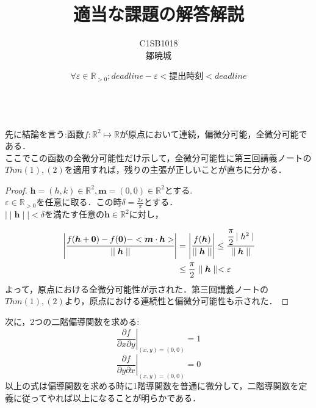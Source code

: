 \documentclass{jarticle}
\begin{document}
\title{適当な課題の解答解説}
\author{C1SB1018 \\鄒暁城}
\date{$\forall \varepsilon \in \mathbb{R}_{>0} ; deadline - \varepsilon < \text{提出時刻} <deadline$}
\maketitle
\noindent
{}\\
先に結論を言う:函数$f : \mathbb{R}^2 \mapsto \mathbb{R}$が原点において連続，偏微分可能，全微分可能である．\\
ここでこの函数の全微分可能性だけ示して，全微分可能性に第三回講義ノートの
$Thm(1),(2)$を適用すれば，残りの主張が正しいことが直ちに分かる．
\begin{proof}
$\bm{h} =(h,k) \in \mathbb{R}^2 , \bm{m} = (0,0) \in \mathbb{R}^2$とする.\\
$ \varepsilon \in \mathbb{R}_{>0} $を任意に取る．この時$ \delta = \frac{2 \varepsilon }{ \pi }$とする．\\
$ \mid \mid \bm{h} \mid \mid < \delta $を満たす任意の$ \bm{h} \in \mathbb{R}^2$に対し，\\
$$
\begin{aligned}
\left| \cfrac{f(\bm{h}+\bm{0})-f(\bm{0}) - < \bm{m} \cdot \bm{h}>}{ \mid \mid \bm{h} \mid \mid } \right| & = \left| \cfrac{f(\bm{h})}{\mid \mid \bm{h} \mid \mid} \right|  \le  \cfrac{\cfrac{\pi}{2} \mid h^2 \mid }{\mid \mid \bm{h} \mid \mid } \\								       
& \le  \frac{\pi}{2}\mid \mid \bm{h} \mid \mid	 <  \varepsilon
\end{aligned}
$$
よって，原点における全微分可能性が示された．第三回講義ノートの$Thm(1),(2)$より，原点における連続性と偏微分可能性も示された．
\end{proof}
次に，2つの二階偏導関数を求める:\\
$$
\left. \frac{\partial f}{\partial x \partial y}\right|_{(x,y)=(0,0)}=1
$$
$$
\left. \frac{\partial f}{\partial y \partial x}\right|_{(x,y)=(0,0)}=0
$$
以上の式は偏導関数を求める時に1階導関数を普通に微分して，二階導関数を定義に従ってやれば以上になることが明らかである．\\
\\
\noindent {}
\end{document}
